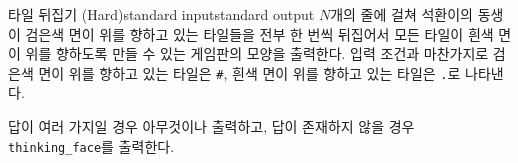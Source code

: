 \begin{problem}{타일 뒤집기 (Hard)}{standard input}{standard output}
\OutputFile
$N$개의 줄에 걸쳐 석환이의 동생이 검은색 면이 위를 향하고 있는 타일들을 전부 한 번씩 뒤집어서 모든 타일이 흰색 면이 위를 향하도록 만들 수 있는 게임판의 모양을 출력한다. 입력 조건과 마찬가지로 검은색 면이 위를 향하고 있는 타일은 \texttt{\#}, 흰색 면이 위를 향하고 있는 타일은 \texttt{.}로 나타낸다.

답이 여러 가지일 경우 아무것이나 출력하고, 답이 존재하지 않을 경우 \texttt{thinking\_face}를 출력한다.

\Example

\begin{example}
%
%
\end{example}

\end{problem}
